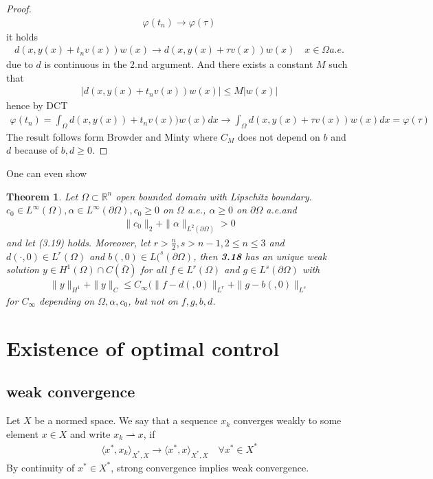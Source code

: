 \documentclass[a4paper,11pt,fleqn]{book}
\newtheorem{theorem}{Theorem}[section]
\theoremstyle{definition}
\theoremstyle{remark}
\begin{document}
\begin{proof}
	\begin{align*}
		\varphi(t_n) \rightarrow \varphi(\tau)
	\end{align*}
	it holds
	\begin{align*}
		d(x, y(x) + t_n v(x)) w(x) \rightarrow d(x, y(x)+ \tau v(x))w(x) \quad x \in \Omega a.e.
	\end{align*}
	due to $d$ is continuous in the 2.nd argument. And there exists a constant $M$ such that
	\begin{align*}
		|d(x, y(x) + t_n v(x))w(x) | \le M |w(x)|
	\end{align*}
	hence by DCT
	\begin{align*}
		\varphi(t_n) = \int_\Omega d(x, y(x)) + t_n v(x)) w(x) dx \rightarrow 
		\int_\Omega d(x, y(x) + \tau v(x) )w(x) dx = \varphi(\tau)
	\end{align*}
	The result follows form Browder and Minty where $C_M$ does not depend on $b$ and $d$ because of $b, d \geq 0$. 
\end{proof}

One can even show 
\begin{theorem}
	Let $\Omega \subset \mathbb{R}^n$ open bounded domain with Lipschitz boundary. $ c_0 \in L^\infty(\Omega), \alpha \in L^\infty(\partial \Omega), c_0 \geq 0$ on $\Omega$ a.e., $\alpha \geq 0$ on $\partial \Omega$ a.e.and 
	\begin{align*}
		\|c_0\|_2 + \|\alpha \|_{L^2(\partial \Omega)} > 0
	\end{align*}
	and let (3.19) holds. Moreover, let $r > \frac{n}{2}, s > n - 1, 2 \le n \le 3$ and $d(\cdot, 0) \in L^r(\Omega)$ and $b(, 0) \in L(^s(\partial \Omega)$, then \textbf{3.18} has an unique weak solution $y \in H^1(\Omega) \cap C(\bar{\Omega})$ for all $f \in L^r(\Omega)$ and $g \in L^s(\partial \Omega)$ with
	\begin{align*}
		\|y\|_{H^1} + \|y\|_{C} \le C_\infty (\|f - d(, 0)\|_{L^r} + \|g - b(, 0)\|_{L^s}
	\end{align*}
	for $C_\infty$ depending on $\Omega, \alpha, c_0$, but not on $f, g, b, d$. 
\end{theorem}


\newpage
\section{Existence of optimal control}
\subsection{weak convergence}
Let $X$ be a normed space. We say that a sequence $x_k$ converges weakly to some element $x \in X$ and write $x_k \rightharpoonup x$, if
\begin{align*}
	\langle x^*, x_k \rangle_{X^*, X} \rightarrow \langle x^*, x\rangle_{X^*, X} \quad \forall x^* \in X^*
\end{align*}
By continuity of $x^* \in X^*$, strong convergence implies weak convergence. 
\end{document}
